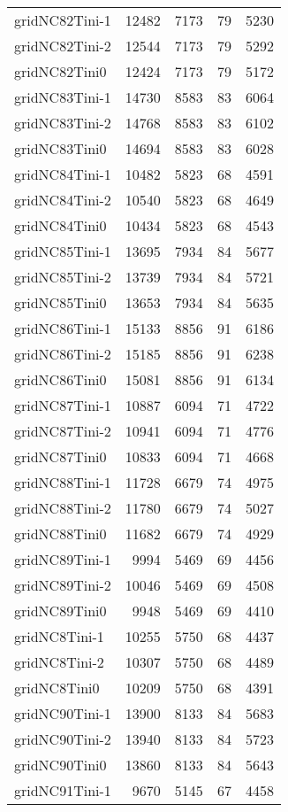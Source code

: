 \documentclass[../../../thesis.tex]{subfiles}
\begin{document}
\begin{longtable}{lrrrr}
gridNC82Tini-1 & 12482 & 7173 & 79 & 5230 \\
gridNC82Tini-2 & 12544 & 7173 & 79 & 5292 \\
gridNC82Tini0 & 12424 & 7173 & 79 & 5172 \\
gridNC83Tini-1 & 14730 & 8583 & 83 & 6064 \\
gridNC83Tini-2 & 14768 & 8583 & 83 & 6102 \\
gridNC83Tini0 & 14694 & 8583 & 83 & 6028 \\
gridNC84Tini-1 & 10482 & 5823 & 68 & 4591 \\
gridNC84Tini-2 & 10540 & 5823 & 68 & 4649 \\
gridNC84Tini0 & 10434 & 5823 & 68 & 4543 \\
gridNC85Tini-1 & 13695 & 7934 & 84 & 5677 \\
gridNC85Tini-2 & 13739 & 7934 & 84 & 5721 \\
gridNC85Tini0 & 13653 & 7934 & 84 & 5635 \\
gridNC86Tini-1 & 15133 & 8856 & 91 & 6186 \\
gridNC86Tini-2 & 15185 & 8856 & 91 & 6238 \\
gridNC86Tini0 & 15081 & 8856 & 91 & 6134 \\
gridNC87Tini-1 & 10887 & 6094 & 71 & 4722 \\
gridNC87Tini-2 & 10941 & 6094 & 71 & 4776 \\
gridNC87Tini0 & 10833 & 6094 & 71 & 4668 \\
gridNC88Tini-1 & 11728 & 6679 & 74 & 4975 \\
gridNC88Tini-2 & 11780 & 6679 & 74 & 5027 \\
gridNC88Tini0 & 11682 & 6679 & 74 & 4929 \\
gridNC89Tini-1 & 9994 & 5469 & 69 & 4456 \\
gridNC89Tini-2 & 10046 & 5469 & 69 & 4508 \\
gridNC89Tini0 & 9948 & 5469 & 69 & 4410 \\
gridNC8Tini-1 & 10255 & 5750 & 68 & 4437 \\
gridNC8Tini-2 & 10307 & 5750 & 68 & 4489 \\
gridNC8Tini0 & 10209 & 5750 & 68 & 4391 \\
gridNC90Tini-1 & 13900 & 8133 & 84 & 5683 \\
gridNC90Tini-2 & 13940 & 8133 & 84 & 5723 \\
gridNC90Tini0 & 13860 & 8133 & 84 & 5643 \\
gridNC91Tini-1 & 9670 & 5145 & 67 & 4458 \\

\end{longtable}
\end{document}
